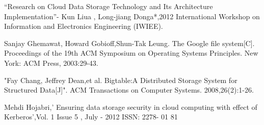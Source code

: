  \newpage
{}
\renewcommand{\bibname}{References}
\begin{thebibliography}{99}


“Research on Cloud Data Storage Technology and Its Architecture Implementation”- Kun Liua
, Long-jiang Donga*,2012 International Workshop on Information and Electronics Engineering (IWIEE).

	Sanjay Ghemawat, Howard Gobioff,Shun-Tak Leung. The Google file system[C]. Proceedings of the 19th ACM Symposium
on Operating Systems Principles. New York: ACM Press, 2003:29-43. 

    "Fay Chang, Jeffrey Dean,et al. Bigtable:A Distributed Storage System for Structured Data[J]". ACM Transactions on
Computer Systems. 2008,26(2):1-26.

    Mehdi Hojabri,’ Ensuring data storage security in cloud computing with effect of Kerberos’,Vol. 1 Issue 5 , July - 2012 ISSN: 2278- 01 81



\end{thebibliography}

